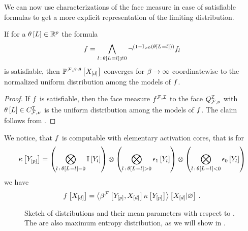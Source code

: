 We can now use characterizations of the face measure in case of satisfiable formulas to get a more explicit representation of the limiting distribution.

\begin{theorem}
    If for a $\theta\left[L\right]\in\mathbb{R}^{p}$ the formula
    \begin{align*}
        f =
        \bigwedge_{l\,:\,\theta\left[L_{}=l_{}\right]\neq0} \lnot^{(1-\mathbb{I}_{>0}\left(\theta\left[L_{}=l_{}\right]\right))} f_{l}
    \end{align*}
    is satisfiable, then $\mathbb{P}^{\mathcal{F},\beta\cdot\theta}\left[X_{[d]}\right]$ converges for $\beta\rightarrow\infty$ coordinatewise to the normalized uniform distribution among the models of $f$.
\end{theorem}
\begin{proof}
    If $f$ is satisfiable, then the face measure $f^{\mathcal{F},\mathcal{I}}$ to the face $Q^{\mathcal{I}}_{\mathcal{F},\nu}$ with $\theta\left[L\right]\in C_{\mathcal{F},\nu}^{\mathcal{I}}$ is the uniform distribution among the models of $f$.
    The claim follows from .
\end{proof}

We notice, that $f$ is computable with elementary activation cores, that is for
\begin{align*}
    \kappa\left[Y_{[p]}\right]
    = \left(\bigotimes_{l\,:\,\theta\left[L_{}=l_{}\right]=0} \mathbb{I}\left[Y_{l}\right]\right)
    \otimes \left(\bigotimes_{l\,:\,\theta\left[L_{}=l_{}\right]>0} \epsilon_1\left[Y_{l}\right]\right)
    \otimes \left(\bigotimes_{l\,:\,\theta\left[L_{}=l_{}\right]<0} \epsilon_0\left[Y_{l}\right]\right)
\end{align*}
we have
\begin{align*}
    f\left[X_{[d]}\right] =
    \left\langle \beta^{\mathcal{F}}\left[Y_{[p]},X_{[d]}\right]\kappa\left[Y_{[p]}\right]\right\rangle \left[ X_{[d]} | \varnothing \right] \, .
\end{align*}



\begin{figure}[t]
    \begin{center}
        
    \end{center}
    \caption{Sketch of distributions and their mean parameters with respect to .
    The \HybridLogicNetworks{} are also maximum entropy distribution, as we will show in .}
    \label{fig:reproducableSketch}
\end{figure}

